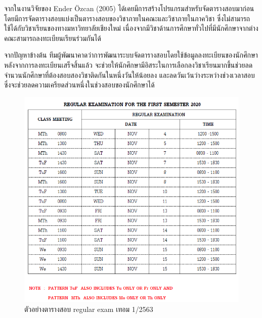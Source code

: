 จากในงานวิจัยของ Ender {\"O}zcan (2005) \cite{fes} ได้เคยมีการสร้างโปรแกรมสำหรับจัดตารางสอบมาก่อนโดยมีการจัดตารางสอบแบ่งเป็นตารางสอบของวิชาภายในคณะและวิชาภายในภาควิชา 
ซึ่งไม่สามารถใช้ได้กับวิชาเรียนของทางมหาวิทยาลัยเชียงใหม่ เนื่องจากมีวิชาด้านการศึกษาทั่วไปที่มีนักศึกษาจากต่างคณะสามารถลงทะเบียนเรียนร่วมกันได้


จากปัญหาข้างต้น ทีมผู้พัฒนาคาดว่าการพัฒนาระบบจัดตารางสอบโดยใช้ข้อมูลลงทะเบียนของนักศึกษา หลังจากการลงทะเบียนเสร็จสิ้นแล้ว 
จะช่วยให้นักศึกษามีอิสระในการเลือกลงวิชาเรียนมากขึ้นช่วยลดจำนวนนักศึกษาที่ต้องสอบสองวิชาติดกันในหนึ่งวันให้น้อยลง และลดวันเว้นว่างระหว่างช่วงเวลาสอบ
ซึ่งจะช่วยลดความเครียดส่วนหนึ่งในช่วงสอบของนักศึกษาได้
\begin{figure}
    \begin{center}
      \includegraphics[width=\linewidth]{images/regular_exam.png}
    \end{center}
    \caption[ตัวอย่างตารางสอบ regular exam เทอม 1/2563]{ตัวอย่างตารางสอบ regular exam เทอม 1/2563}
    \label{fig:regular_exam}     
\end{figure}
